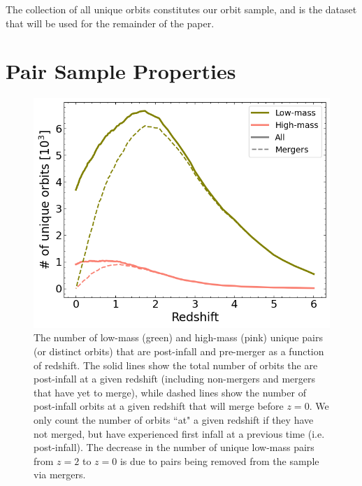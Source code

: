 \documentclass[twocolumn,linenumbers]{aastex631}
\begin{document}

The collection of all unique orbits constitutes our orbit sample, and is the dataset that will be used for the remainder of the paper.


\section{Pair Sample Properties}
\begin{figure}[htb]
    \begin{center}
    \includegraphics[width=\columnwidth]{plots/bet-on-it/6_paircount.png}
    \caption{The number of low-mass (green) and high-mass (pink) unique pairs (or distinct orbits) that are post-infall and pre-merger as a function of redshift. 
    The solid lines show the total number of orbits the are post-infall at a given redshift (including non-mergers and mergers that have yet to merge), while dashed lines show the number of post-infall orbits at a given redshift that will merge before $z=0$.
    We only count the number of orbits ``at" a given redshift if they have not merged, but have experienced first infall at a previous time (i.e. post-infall). 
    The decrease in the number of unique low-mass pairs from $z=2$ to $z=0$ is due to pairs being removed from the sample via mergers.
    }
    \label{fig:numorbits}
    \end{center}
\end{figure}
\end{document}
